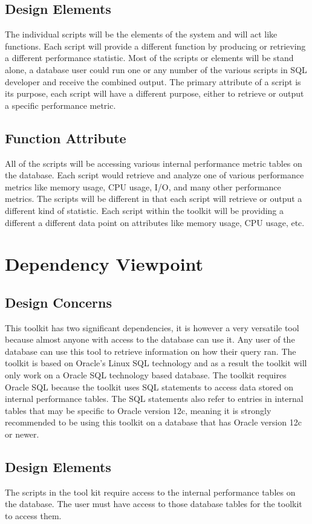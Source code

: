 \documentclass[draftclsnofoot, onecolumn, compsoc, 10pt]{IEEEtran}
\begin{document}
\subsection{Design Elements}
The individual scripts will be the elements of the system and will act like functions.
Each script will provide a different function by producing or retrieving a different performance statistic.
Most of the scripts or elements will be stand alone, a database user could run one or any number of the various scripts in SQL developer and receive the combined output.
The primary attribute of a script is its purpose, each script will have a different purpose, either to retrieve or output a specific performance metric.

\subsection{Function Attribute}
All of the scripts will be accessing various internal performance metric tables on the database. Each script would retrieve and analyze one of various performance metrics like memory usage, CPU usage, I/O, and many other performance metrics.
The scripts will be different in that each script will retrieve or output a different kind of statistic.
Each script  within the toolkit will be providing a different a different data point on attributes like memory usage, CPU usage, etc.

\section{Dependency Viewpoint}
\subsection{Design Concerns}
This toolkit has two significant dependencies, it is however a very versatile tool because almost anyone with access to the database can use it.
Any user of the database can use this tool to retrieve information on how their query ran.
The toolkit is based on Oracle's Linux SQL technology and as a result the toolkit will only work on a Oracle SQL technology based database.
The toolkit requires Oracle SQL because the toolkit uses SQL statements to access data stored on internal performance tables.
The SQL statements also refer to entries in internal tables that may be specific to Oracle version 12c, meaning it is strongly recommended to be using this toolkit on a database that has Oracle version 12c or newer. 
\subsection{Design Elements}
The scripts in the tool kit require access to the internal performance tables on the database. The user must have access to those database tables for the toolkit to access them. 
\end{document}
